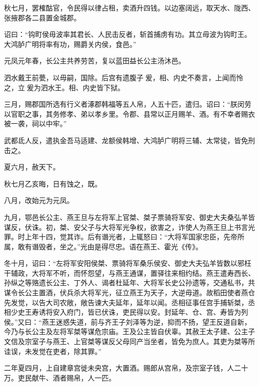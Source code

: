 \documentclass[12pt,UTF8]{ctexbook}
\begin{document}
秋七月，罢榷酤官，令民得以律占租，卖酒升四钱。以边塞阔远，取天水、陇西、张掖郡各二县置金城郡。



诏曰：“钩町侯毋波率其君长、人民击反者，斩首捕虏有功。其立毋波为钩町王。大鸿胪广明将率有功，赐爵关内侯，食邑。”



元凤元年春，长公主共养劳苦，复以蓝田益长公主汤沐邑。



泗水戴王前甍，以毋嗣，国除。后宫有遗腹子爰，相、内史不奏言，上闻而怜之，立爰为泗水王。相、内史皆下狱。



三月，赐郡国所选有行义者涿郡韩福等五人帛，人五十匹，遣归。诏曰：“朕闵劳以官职之事，其务修孝、弟以孝乡里。令郡、县常以正月赐羊、酒。有不幸者赐衣被一袭，祠以中牢。”



武都氐人反，遣执金吾马适建、龙额侯韩增、大鸿胪广明将三辅、太常徒，皆免刑击之。



夏六月，赦天下。



秋七月乙亥晦，日有蚀之，既。



八月，改始元为元凤。



九月，鄂邑长公主、燕王旦与左将军上官桀、桀子票骑将军安、御史大夫桑弘羊皆谋反，伏诛。初，桀、安父子与大将军光争权，欲害之，诈使人为燕王旦上书言光罪。时上年十四，觉其诈。后有谮光者，上辄怒曰：“大将军国家忠臣，先帝所属，敢有谮毁者，坐之。”光由是得尽忠。语在燕王、霍光《传》。



冬十月，诏曰：“左将军安阳侯桀、票骑将军桑乐侯安、御史大夫弘羊皆数以邪枉干辅政，大将军不听，而怀怨望，与燕王通谋，置驿往来相约结。燕王遣寿西长、孙纵之等赂遗长公主、丁外人、谒者杜延年、大将军长史公孙遗等，交通私书，共谋令长公主置酒，伏兵杀大将军光，征立燕王为天子，大逆毋道。故稻田使者燕仓先发觉，以告大司农敞，敞告谏大夫延年，延年以闻。丞相征事任宫手捕斩桀，丞相少史王寿诱将安入府门，皆已伏诛，吏民得以安。封延年、仓、宫、寿皆为列侯。”又曰：“燕王迷惑失道，前与齐王子刘泽等为逆，抑而不扬，望王反道自新，今乃与长公主及左将军桀等谋危宗庙。王及公主皆自伏辜。其赦王太子建、公主子文信及宗室子与燕王、上官桀等谋反父母同产当坐者，皆免为庶人。其吏为桀等所诖误，未发觉在吏者，除其罪。”



二年夏四月，上自建章宫徙未央宫，大置酒。赐郎从宫帛，及宗室子钱，人二十万。吏民献牛、酒者赐帛，人一匹。
\end{document}
